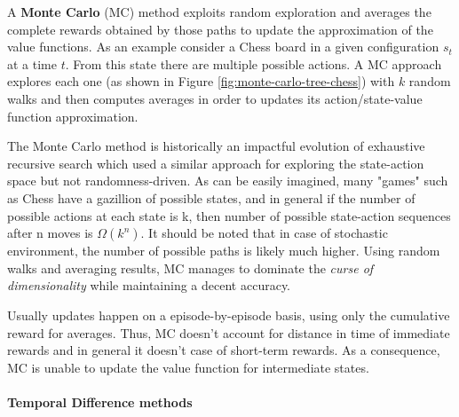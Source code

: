 A \textbf{Monte Carlo} (MC) method exploits random exploration and averages the complete rewards obtained by those paths to update the approximation of the value functions.
As an example consider a Chess board in a given configuration $s_t$ at a time $t$. From this state there are multiple possible actions. A MC approach explores each one (as shown in Figure \ref{fig:monte-carlo-tree-chess}) with $k$ random walks and then computes averages in order to updates its action/state-value function approximation.

The Monte Carlo method is historically an impactful evolution of exhaustive recursive search which used a similar approach for exploring the state-action space but not randomness-driven. As can be easily imagined, many "games" such as Chess have a gazillion of possible states, and in general if the number of possible actions at each state is k, then number of possible state-action sequences after n moves is $\Omega(k^n)$. It should be noted that in case of stochastic environment, the number of possible paths is likely much higher. Using random walks and averaging results, MC manages to dominate the \textit{curse of dimensionality} while maintaining a decent accuracy.

Usually updates happen on a episode-by-episode basis, using only the cumulative reward for averages. Thus, MC doesn't account for distance in time of immediate rewards and in general it doesn't case of short-term rewards. As a consequence, MC is unable to update the value function for intermediate states.


\paragraph{Temporal Difference methods}
